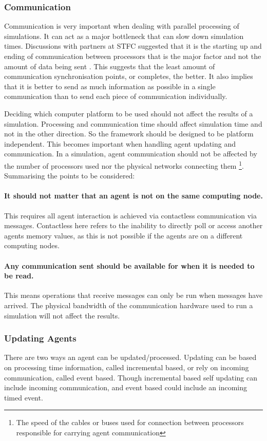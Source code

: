 \documentclass[a4paper,11pt]{article}
\begin{document}
\subsubsection{Communication}
Communication is very important when dealing with parallel
processing of simulations. It can act as a major bottleneck that can
slow down simulation times. Discussions with partners at STFC suggested that it
is the starting up and ending of communication between processors that is the major
factor and not the amount of data being sent \cite{HPCX:2003}. This suggests that the
least amount of communication synchronisation points, or completes, the better. It
also implies that it is better to send as much information as possible in a single communication than to send each piece of communication individually.

Deciding which computer platform to be used should not affect the results of a simulation.
Processing and communication time should affect simulation time and not in the other direction.
So the framework should be designed to be platform independent.
This becomes important when handling agent updating and communication.
In a simulation, agent communication should not be affected by the
number of processors used nor the physical
networks connecting them \footnote{The speed of the
cables or buses used for connection between processors responsible
for carrying agent communication}.
Summarising the points to be considered:

\paragraph{It should not matter that an agent is not on the same computing node.}
This requires all agent interaction is achieved via contactless communication via messages.
Contactless here refers to the inability to directly poll or access another agents memory values, as this is not possible if the agents are on a different computing nodes.

\paragraph{Any communication sent should be available for when it is needed to be read.}
This means operations that receive messages can only be run when messages have arrived.
The physical bandwidth of the communication hardware used to run a simulation will not affect the results.

\subsubsection{Updating Agents}
There are two ways an agent can be updated/processed.
Updating can be based on processing time information, called incremental based, or rely on incoming communication, called event based.
Though incremental based self updating can include incoming communication, and event based could include an incoming timed event.
\end{document}
